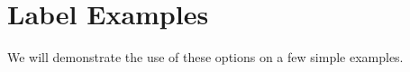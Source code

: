 \section{Label Examples}

We will demonstrate the use of these options on a few simple examples.





